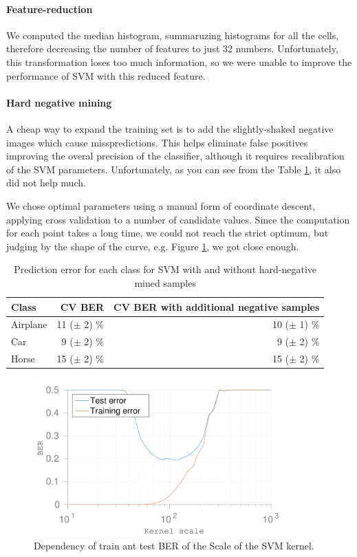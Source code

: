 \documentclass{article} %
\begin{document}
\paragraph{Feature-reduction} We computed the median histogram, summaruzing histograms for all the cells, therefore decreasing the number of features to just 32 numbers. Unfortunately, this transformation loses too much information, so we were unable to improve the performance of SVM with this reduced feature.

\paragraph{Hard negative mining} A cheap way to expand the training set is to add the slightly-shaked negative images which cause misspredictions. This helps eliminate false positives improving the overal precision of the classifier, although it requires recalibration of the SVM parameters. Unfortunately, as you can see from the Table \ref{tbl:SVMerr}, it also did not help much.

We chose optimal parameters using a manual form of coordinate descent, applying cross validation to a number of candidate values. Since the computation for each point takes a long time, we could not reach the strict optimum, but judging by the shape of the curve, e.g. Figure \ref{fig:SVMKernelScaleBER}, we got close enough.

\begin{table}
  \centering
  \begin{tabular}{|l|r|r|}
    \hline
    Class & CV BER & CV BER with additional negative samples \\ \hline
    Airplane & 11 ($\pm$ 2) \% & 10 ($\pm$ 1) \% \\
    Car & 9 ($\pm$ 2) \% & 9 ($\pm$ 2) \% \\
    Horse & 15 ($\pm$ 2) \% & 15 ($\pm$ 2) \% \\
    \hline
  \end{tabular}
  \caption{Prediction error for each class for SVM with and without hard-negative mined samples}
  \label{tbl:SVMerr}
\end{table}


\begin{figure}[!t]
  \centering
  \includegraphics[width=0.9\textwidth]{figures/kernel_scale_ber.pdf}
  \caption{Dependency of train ant test BER of the Scale of the SVM kernel.}
  \label{fig:SVMKernelScaleBER}
\end{figure}
\end{document}
